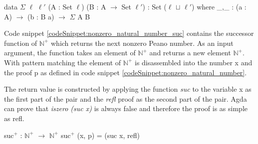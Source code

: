 \begin{codesnippet}[mathescape=true, caption={Definition of $\Sigma$ in Agda}, label={codeSnippet:sigma}]
data $\Sigma$ {$\ell$ $\ell '$} (A : Set $\ell$) (B : A $\rightarrow$ Set $\ell '$)
 : Set ($\ell$ $\sqcup$ $\ell '$) where
_,_ : (a : A) $\rightarrow$ (b : B a) $\rightarrow$ $\Sigma$ A B
\end{codesnippet}

Code snippet \ref{codeSnippet:nonzero_natural_number_suc} contains the successor function of $\mathbb{N}^+$ which returns the next nonzero Peano number.
As an input argument, the function takes an element of $\mathbb{N}^+$ and returns a new element $\mathbb{N}^+$. 
With pattern matching the element of $\mathbb{N}^+$ is disassembled into the number x and the proof p as defined in code snippet \ref{codeSnippet:nonzero_natural_number}.

The return value is constructed by applying the function \emph{suc} to the variable x as the first part of the pair and the \emph{refl} proof as the second part of the pair.
Agda can prove that \emph{iszero (suc x)} is always false and therefore the proof is as simple as refl.

\begin{codesnippet}[mathescape=true, caption={Successor of $\mathbb{N}^+$}, label={codeSnippet:nonzero_natural_number_suc}]
suc$^+$ : $\mathbb{N}^+$ $\rightarrow$ $\mathbb{N}^+$
suc$^+$ (x, p) = (suc x, refl)
\end{codesnippet}